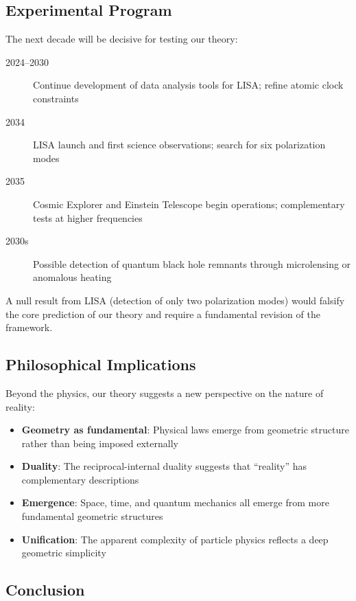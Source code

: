 \subsection{Experimental Program}

The next decade will be decisive for testing our theory:

\begin{description}
    \item[2024--2030] Continue development of data analysis tools for LISA; refine atomic clock constraints
    \item[2034] LISA launch and first science observations; search for six polarization modes
    \item[2035] Cosmic Explorer and Einstein Telescope begin operations; complementary tests at higher frequencies
    \item[2030s] Possible detection of quantum black hole remnants through microlensing or anomalous heating
\end{description}

A null result from LISA (detection of only two polarization modes) would falsify the core prediction of our theory and require a fundamental revision of the framework.

\subsection{Philosophical Implications}

Beyond the physics, our theory suggests a new perspective on the nature of reality:

\begin{itemize}
    \item \textbf{Geometry as fundamental}: Physical laws emerge from geometric structure rather than being imposed externally
    \item \textbf{Duality}: The reciprocal-internal duality suggests that ``reality'' has complementary descriptions
    \item \textbf{Emergence}: Space, time, and quantum mechanics all emerge from more fundamental geometric structures
    \item \textbf{Unification}: The apparent complexity of particle physics reflects a deep geometric simplicity
\end{itemize}

\subsection{Conclusion}

